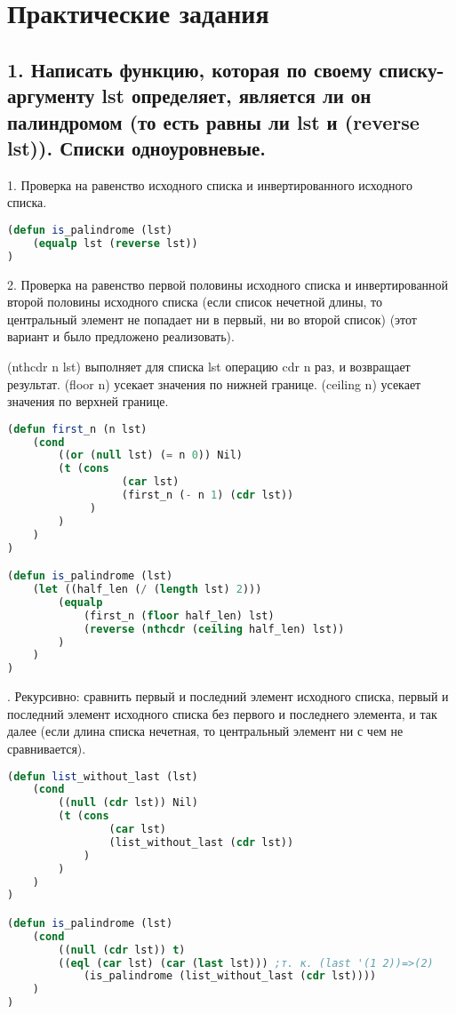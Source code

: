 \documentclass[12pt]{report}
\begin{document}
	\thispagestyle{empty}


	




\chapter*{Практические задания}	

\section*{1. Написать функцию, которая по своему списку-аргументу lst определяет, является ли он палиндромом (то есть равны ли lst и (reverse lst)). Списки одноуровневые.}

1. Проверка на равенство исходного списка и инвертированного исходного списка.
\begin{lstlisting}[language=Lisp]
(defun is_palindrome (lst) 
	(equalp lst (reverse lst))
)
\end{lstlisting}

2. Проверка на равенство первой половины исходного списка и инвертированной второй половины исходного списка (если список нечетной длины, то центральный элемент не попадает ни в первый, ни во второй список) (этот вариант и было предложено реализовать).

(nthcdr n lst) выполняет для списка lst операцию cdr n раз, и возвращает результат. (floor n) усекает значения по нижней границе. (ceiling n) усекает значения по верхней границе.
\begin{lstlisting}[language=Lisp]
(defun first_n (n lst) 
	(cond 
		((or (null lst) (= n 0)) Nil)
		(t (cons 
				  (car lst) 
				  (first_n (- n 1) (cdr lst))
			 )
		)
	)
)

(defun is_palindrome (lst)
	(let ((half_len (/ (length lst) 2)))
		(equalp 
			(first_n (floor half_len) lst) 
			(reverse (nthcdr (ceiling half_len) lst))
		)
	)
)
\end{lstlisting}

. Рекурсивно: сравнить первый и последний элемент исходного списка, первый и последний элемент исходного списка без первого и последнего элемента, и так далее (если длина списка нечетная, то центральный элемент ни с чем не сравнивается).

\begin{lstlisting}[language=Lisp]
(defun list_without_last (lst)
	(cond
		((null (cdr lst)) Nil)
		(t (cons 
				(car lst) 
				(list_without_last (cdr lst))
			)
		)
	)
)

(defun is_palindrome (lst)
	(cond 
		((null (cdr lst)) t)
		((eql (car lst) (car (last lst))) ;т. к. (last '(1 2))=>(2)
			(is_palindrome (list_without_last (cdr lst))))
	)
)
\end{lstlisting}
\end{document}
